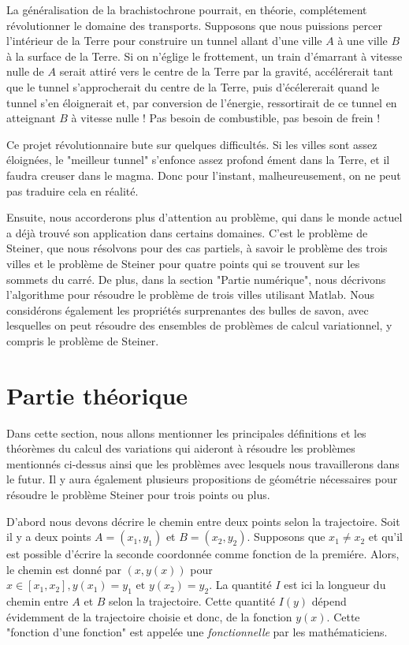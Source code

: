 \documentclass[10pt,a4paper]{article}%
\theoremstyle{theorem}
\theoremstyle{definition}
\begin{document}
 	La généralisation de la brachistochrone pourrait, en théorie, complétement révolutionner le domaine des transports. Supposons que nous puissions percer l’intérieur de la Terre pour construire un tunnel allant d’une ville $A$ à une ville $B$ à la surface de la Terre. Si on n'églige le frottement, un train d'émarrant à vitesse nulle de $A$ serait attiré vers le centre de la Terre par la gravité, accélérerait tant que le tunnel s'approcherait du centre de la Terre, puis d'écélererait quand le tunnel s'en éloignerait et, par conversion de l'énergie, ressortirait de ce tunnel en atteignant $B$ à vitesse nulle ! Pas besoin de combustible, pas besoin de frein ! 	
	 
	Ce projet révolutionnaire bute sur quelques difficultés. Si les villes sont assez  éloignées, le "meilleur tunnel" s'enfonce assez profond ément dans la Terre, et il faudra creuser dans le magma. Donc pour l'instant, malheureusement, on ne peut pas traduire cela en réalité.
	 
	Ensuite, nous accorderons plus d'attention au problème, qui dans le monde actuel a déjà trouvé son application dans certains domaines. C'est le problème de Steiner, que nous résolvons pour des cas partiels, à savoir le problème des trois villes et le problème de Steiner pour quatre points qui se trouvent sur les sommets du carré. De plus, dans la section "Partie numérique", nous décrivons l'algorithme pour résoudre le problème de trois villes utilisant Matlab. Nous considérons également les propriétés surprenantes des bulles de savon, avec lesquelles on peut résoudre des ensembles de problèmes de calcul variationnel, y compris le problème de Steiner.

	
	\section{Partie théorique}
	
	Dans cette section, nous allons mentionner les principales définitions et les théorèmes du calcul des variations qui aideront à résoudre les problèmes mentionnés ci-dessus ainsi que les problèmes avec lesquels nous travaillerons dans le futur. Il y aura également plusieurs propositions de géométrie nécessaires pour résoudre le problème Steiner pour trois points ou plus.
	
	
	D'abord nous devons décrire le chemin entre deux points selon la trajectoire. Soit il y a deux points $A=(x_1,y_1)$ et $B=(x_2,y_2)$. Supposons que $x_1 \neq x_2$ et qu'il est possible d'écrire la seconde coordonnée comme fonction de la premiére. Alors, le chemin est donné par $(x,y(x))$ pour $x \in [x_1,x_2], y(x_1)=y_1 \text{ et } y(x_2)=y_2.$ La quantité $I$ est ici la longueur du chemin entre $A$ et $B$ selon la trajectoire. Cette quantité $I(y)$ dépend évidemment de la trajectoire choisie et donc, de la fonction $y(x)$. Cette "fonction d'une fonction" est appelée une \textit{fonctionnelle} par les mathématiciens. 
	
\end{document}
